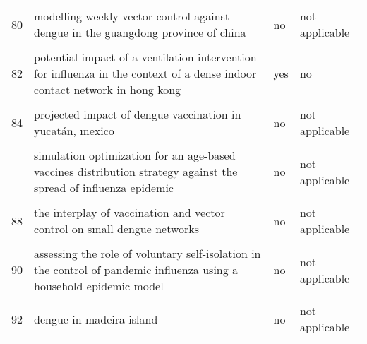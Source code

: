 \documentclass[
]{article}
\begin{document}
\begin{landscape}
\begin{longtable}{l>{\raggedright\arraybackslash}p{4cm}l>{\raggedright\arraybackslash}p{4cm}}
80 & modelling weekly vector control against dengue in the guangdong province of china & no & not applicable\\
\addlinespace
\cellcolor{gray!6}{81} & \cellcolor{gray!6}{optimal control strategies for the spread of ebola in west africa} & \cellcolor{gray!6}{no} & \cellcolor{gray!6}{not applicable}\\
82 & potential impact of a ventilation intervention for influenza in the context of a dense indoor contact network in hong kong & yes & no\\
\cellcolor{gray!6}{83} & \cellcolor{gray!6}{predicting and evaluating the epidemic trend of ebola virus disease in the 2014-2015 outbreak and the effects of intervention measures} & \cellcolor{gray!6}{no} & \cellcolor{gray!6}{not applicable}\\
84 & projected impact of dengue vaccination in yucatán, mexico & no & not applicable\\
\cellcolor{gray!6}{85} & \cellcolor{gray!6}{seasonality and the effectiveness of mass vaccination} & \cellcolor{gray!6}{no} & \cellcolor{gray!6}{not applicable}\\
\addlinespace
86 & simulation optimization for an age-based vaccines distribution strategy against the spread of influenza epidemic & no & not applicable\\
\cellcolor{gray!6}{87} & \cellcolor{gray!6}{spatiotemporal dynamics of the ebola epidemic in guinea and implications for vaccination and disease elimination: a computational modeling analysis} & \cellcolor{gray!6}{no} & \cellcolor{gray!6}{not applicable}\\
88 & the interplay of vaccination and vector control on small dengue networks & no & not applicable\\
\cellcolor{gray!6}{89} & \cellcolor{gray!6}{an epidemic patchy model with entry–exit screening} & \cellcolor{gray!6}{no} & \cellcolor{gray!6}{not applicable}\\
90 & assessing the role of voluntary self-isolation in the control of pandemic influenza using a household epidemic model & no & not applicable\\
\addlinespace
\cellcolor{gray!6}{91} & \cellcolor{gray!6}{be-codis: a mathematical model to predict the risk of human diseases spread between countries—validation and application to the 2014–2015 ebola virus disease epidemic} & \cellcolor{gray!6}{no} & \cellcolor{gray!6}{not applicable}\\
92 & dengue in madeira island & no & not applicable\\

\end{longtable}
\end{landscape}
\end{document}

